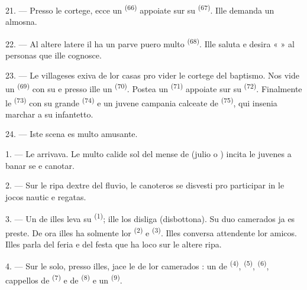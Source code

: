 \VUsaut{4.6mm}
\VUsaut{3.4mm}

21. --- Presso le cortege, ecce un 
\textsuperscript{(66)} appoiate sur su  \textsuperscript{(67)}.
Ille demanda un almosna.

22. --- Al altere latere il ha un parve puero multo 
\textsuperscript{(68)}. Ille saluta e desira «  » al personas
que ille cognosce.

23. --- Le villageses exiva de lor casas pro vider le cortege del baptismo. Nos
vide un  \textsuperscript{(69)} con su  e presso ille un  \textsuperscript{(70)}. Postea un
 \textsuperscript{(71)} appoiate sur su 
\textsuperscript{(72)}. Finalmente le  \textsuperscript{(73)}
con su grande  \textsuperscript{(74)} e un juvene
campania calceate de  \textsuperscript{(75)}, qui
insenia marchar a su infantetto.

24. --- Iste scena es multo amusante.
\VUsaut{4.0mm}

\VUsaut{3.0mm}

\VUsaut{2.4mm}

\VUsaut{3.0mm}

1. --- Le  arrivava. Le multo calide sol del mense de
 (julio o ) incita le juvenes a banar se e
canotar.

2. --- Sur le ripa dextre del fluvio, le canoteros se disvesti pro participar in
le jocos nautic e regatas.

3. --- Un de illes leva su  \textsuperscript{(1)}; ille los
disliga (disbottona). Su duo camerados ja es preste. De ora illes ha solmente
lor  \textsuperscript{(2)} e 
\textsuperscript{(3)}. Illes conversa attendente lor amicos. Illes parla del
feria e del festa que ha loco sur le altere ripa.

4. --- Sur le solo, presso illes, jace le  de lor camerados
: un  de  \textsuperscript{(4)}, 
\textsuperscript{(5)},  \textsuperscript{(6)}, cappellos de
 \textsuperscript{(7)} e de  \textsuperscript{(8)}
e un  \textsuperscript{(9)}.

